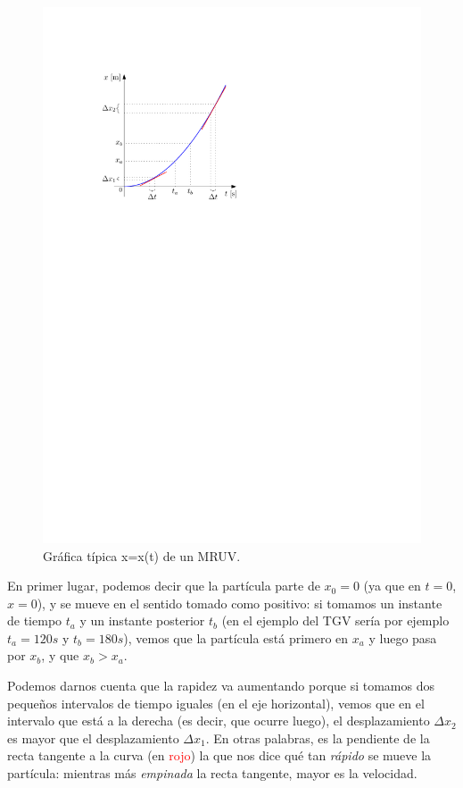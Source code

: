 \begin{figure}[!h]
  \centering
  \includegraphics[scale=1]{img/rectatangente.pdf}
  \caption{\label{fig:rectatangente} Gráfica típica x=x(t) de un MRUV.}
\end{figure}

En primer lugar, podemos decir que la partícula parte de $x_0 = 0$ (ya que en $t=0$, $x=0$), y se mueve en el sentido tomado como positivo: si tomamos un instante de tiempo $t_a$ y un instante posterior $t_b$ (en el ejemplo del TGV sería por ejemplo $t_a =120\si{s}$ y $t_b=180\si{s}$), vemos que la partícula está primero en $x_a$ y luego pasa por $x_b$, y que $x_b > x_a$.

Podemos darnos cuenta que la rapidez va aumentando porque si tomamos dos pequeños intervalos de tiempo iguales (en el eje horizontal), vemos que en el intervalo que está a la derecha (es decir, que ocurre luego), el desplazamiento $\Delta x_2$ es mayor que el desplazamiento $\Delta x_1$. En otras palabras, es la pendiente de la recta tangente a la curva (en \textcolor{red}{rojo}) la que nos dice qué tan \textit{rápido} se mueve la partícula: mientras más \textit{empinada} la recta tangente, mayor es la velocidad.

